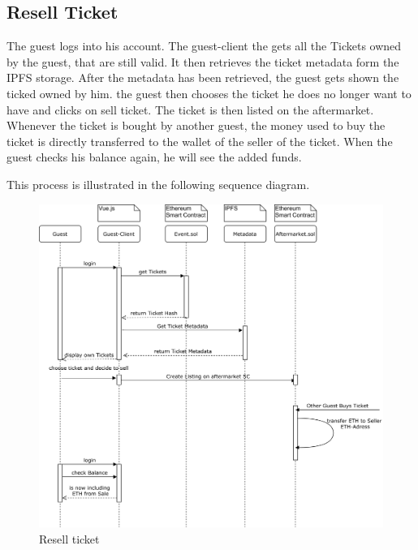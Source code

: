 \subsection{Resell Ticket}
The guest logs into his account. The guest-client the gets all the Tickets owned by the guest, that are still valid. It then retrieves the ticket metadata form the IPFS storage. After the metadata has been retrieved, the guest gets shown the ticked owned by him. the guest then chooses the ticket he does no longer want to have and clicks on sell ticket. The ticket is then listed on the aftermarket. Whenever the ticket is bought by another guest, the money used to buy the ticket is directly transferred to the wallet of the seller of the ticket. When the guest checks his balance again, he will see the added funds.

This process is illustrated in the following sequence diagram.

\begin{figure}[H]
    \centering
    \includegraphics[width=16cm]{design/diagrams/Resell Ticket.png}
    \caption{Resell ticket}
    \label{fig:Resell-ticket}
\end{figure}

 



